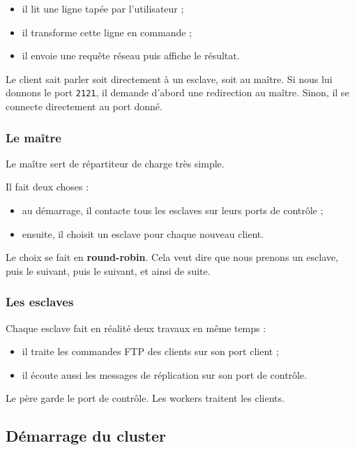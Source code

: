 \documentclass[a4paper,11pt]{article}
\begin{document}
\begin{itemize}[leftmargin=*]
    \item il lit une ligne tapée par l'utilisateur ;
    \item il transforme cette ligne en commande ;
    \item il envoie une requête réseau puis affiche le résultat.
\end{itemize}

Le client sait parler soit directement à un esclave, soit au maître. Si nous lui
donnons le port \texttt{2121}, il demande d'abord une redirection au maître.
Sinon, il se connecte directement au port donné.

\subsubsection{Le maître}

Le maître sert de répartiteur de charge très simple.

Il fait deux choses :

\begin{itemize}[leftmargin=*]
    \item au démarrage, il contacte tous les esclaves sur leurs ports de contrôle ;
    \item ensuite, il choisit un esclave pour chaque nouveau client.
\end{itemize}

Le choix se fait en \textbf{round-robin}. Cela veut dire que nous prenons un
esclave, puis le suivant, puis le suivant, et ainsi de suite.

\subsubsection{Les esclaves}

Chaque esclave fait en réalité deux travaux en même temps :

\begin{itemize}[leftmargin=*]
    \item il traite les commandes FTP des clients sur son port client ;
    \item il écoute aussi les messages de réplication sur son port de contrôle.
\end{itemize}

Le père garde le port de contrôle. Les workers traitent les clients.

\subsection{Démarrage du cluster}
\end{document}
